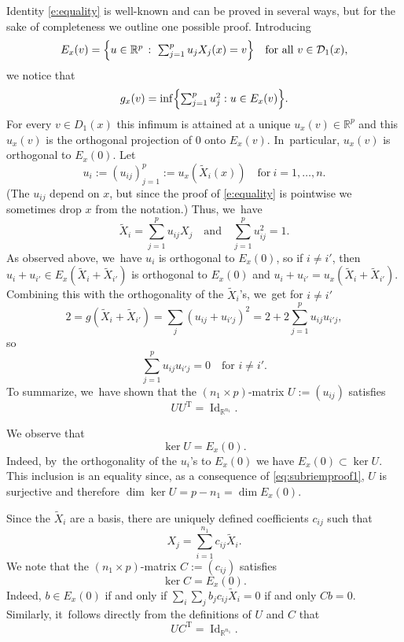 \documentclass[JEP,XML,SOM,Unicode,published]{cedram}
\DeclareMathOperator{\Id}{Id}
\theoremstyle{definition}
\newcommand{\1}{\mathbbm{1}}
\newcommand{\R}{\mathbb{R}}
\begin{document}
Identity \eqref{e:equality} is well-known and can be proved in several ways, but for the sake of completeness we outline one possible proof. Introducing
\[
E_x(v)= \Bigl\{\textstyle u\in \mathbb R^p\,:\ \sum_{j=1}^{p} u_j X_j(x) =v\Bigr\}
\quad\text{for all}\ v\in \mathcal D_1(x),
\]
we notice that
\[
g_x(v) = \inf\Bigl\{ \textstyle\sum_{j=1}^p u_j^2 : u\in E_x(v)\Bigr\}.
\]
For every $v\in D_1(x)$ this infimum is attained at a unique $u_x(v)\in \mathbb R^p$ and this $u_x(v)$ is the orthogonal projection of $0$ onto $E_x(v)$. In~particular, $u_x(v)$ is orthogonal to $E_x(0)$. Let
\[
u_i := (u_{ij})_{j=1}^p := u_x(\tilde X_i(x))
\quad\text{for}\ i=1,\ldots, n.
\]
(The $u_{ij}$ depend on $x$, but since the proof of \eqref{e:equality} is pointwise we sometimes drop $x$ from the notation.) Thus, we~have
\[
\tilde{X}_i=\sum_{j=1}^p u_{ij} X_j
\quad\text{and}\quad\sum_{j=1}^p u_{ij}^2=1.
\]
As observed above, we~have $u_i$ is orthogonal to $E_x(0)$, so if $i\neq i'$, then $u_i+ u_{i'}\in E_x(\tilde{X}_i+\tilde X_{i'})$ is orthogonal to $E_x(0)$ and $u_i + u_{i'} = u_x(\tilde{X}_i+\tilde X_{i'})$. Combining this with the orthogonality of the $\tilde{X}_i$'s, we~get for $i\neq i'$
\[
2= g(\tilde X_i+\tilde X_{i'})= \sum_j (u_{ij} +u_{i'j})^2 = 2 +2 \sum_{j=1}^p u_{ij} u_{i' j},
\]
so
\[
\sum_{j=1}^p u_{ij} u_{i' j}=0 \quad\text{for } i\neq i'.
\]
To summarize, we~have shown that the $(n_1\times p)$-matrix $U:=(u_{ij})$ satisfies
\begin{equation}
\label{eq:subriemproof1}
U U^\mathrm{T} = {\Id_{\R^{n_1}}}.
\end{equation}

We observe that
\begin{equation}
\label{eq:subriemproof3}
\ker U = E_x(0).
\end{equation}
Indeed, by~the orthogonality of the $u_i$'s to $E_x(0)$ we have $E_x(0)\subset \ker U$. This inclusion is an equality since, as a consequence of \eqref{eq:subriemproof1}, $U$ is surjective and therefore $\dim \ker U = p - n_1 = \dim E_x(0)$.

Since the $\tilde X_i$ are a basis, there are uniquely defined coefficients $c_{ij}$ such that
\[
X_j =\sum_{i=1}^{n_1} c_{ij} \tilde X_i.
\]
We note that the $(n_1\times p)$-matrix $C :=(c_{ij})$ satisfies
\begin{equation}
\label{eq:subriemproof4}
\ker C = E_x(0).
\end{equation}
Indeed, $b\in E_x(0)$ if and only if $\sum_i \sum_j b_j c_{ij} \tilde X_i = 0$ if and only $C b =0$. Similarly, it~follows directly from the definitions of $U$ and $C$ that
\begin{equation}
\label{eq:subriemproof2}
U C^\mathrm{T} = {\Id_{\R^{n_1}}}.
\end{equation}
\end{document}
